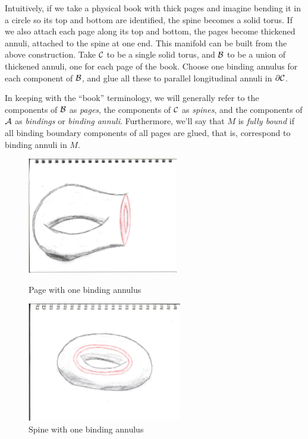 Intuitively, if we take a physical book with thick pages and imagine bending it
in a circle so its top and bottom are identified, the spine becomes a solid
torus.  If we also attach each page along its top and bottom, the pages become
thickened annuli, attached to the spine at one end. This manifold can be built
from the above construction. Take $\mathcal{C}$ to be a single solid torus, and $\mathcal{B}$
to be a union of thickened annuli, one for each page of the book. Choose one
binding annulus for each component of $\mathcal{B}$, and glue all these to parallel
longitudinal annuli in $\partial \mathcal{C}$.

\begin{defn}

In keeping with the ``book'' terminology, we will generally refer to the
components of $\mathcal{B}$ as \emph{pages}, the components of $\mathcal{C}$ as \emph{spines},
and the components of $\mathcal{A}$ as \emph{bindings} or \emph{binding annuli}.
Furthermore, we'll say that $M$ is \emph{fully bound} if all binding boundary
components of all pages are glued, that is, correspond to binding annuli in
$M$.

\end{defn}

\begin{figure}
\noindent
    \begin{minipage}{0.45\textwidth}
        \noindent
        \includegraphics[width=\textwidth,height=2in]{fig-page}
        \caption{Page with one binding annulus}
        \label{F:page}
    \end{minipage}\hfill
    \begin{minipage}{0.45\textwidth}
        \noindent
        \includegraphics[width=\textwidth,height=2.05in]{fig-spine}
        \caption{Spine with one binding annulus}
        \label{F:spine}
    \end{minipage}
\end{figure}

